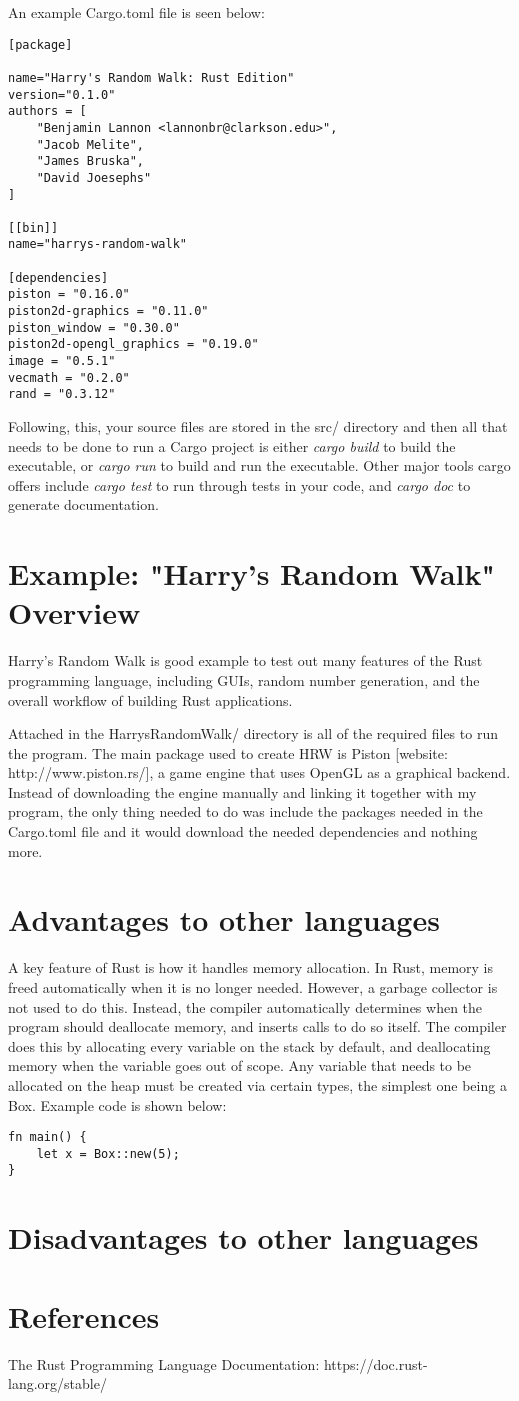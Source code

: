 \documentclass{article}
\begin{document}
An example Cargo.toml file is seen below:

\begin{lstlisting}
[package]

name="Harry's Random Walk: Rust Edition"
version="0.1.0"
authors = [
	"Benjamin Lannon <lannonbr@clarkson.edu>",
	"Jacob Melite",
	"James Bruska",
	"David Joesephs"
]

[[bin]]
name="harrys-random-walk"

[dependencies]
piston = "0.16.0"
piston2d-graphics = "0.11.0"
piston_window = "0.30.0"
piston2d-opengl_graphics = "0.19.0"
image = "0.5.1"
vecmath = "0.2.0"
rand = "0.3.12"
\end{lstlisting}

Following, this, your source files are stored in the src/ directory and then all that needs to be done to run a Cargo project is either \emph{cargo build} to build the executable, or \emph{cargo run} to build and run the executable. Other major tools cargo offers include \emph{cargo test} to run through tests in your code, and \emph{cargo doc} to generate documentation.

\section{Example: "Harry's Random Walk" Overview}
Harry's Random Walk is good example to test out many features of the Rust programming language, including GUIs, random number generation, and the overall workflow of building Rust applications.

Attached in the HarrysRandomWalk/ directory is all of the required files to run the program. The main package used to create HRW is Piston [website: http://www.piston.rs/], a game engine that uses OpenGL as a graphical backend. Instead of downloading the engine manually and linking it together with my program, the only thing needed to do was include the packages needed in the Cargo.toml file and it would download the needed dependencies and nothing more.

\section{Advantages to other languages}
A key feature of Rust is how it handles memory allocation. In Rust, memory is freed automatically when it is no longer needed. However, a garbage collector is not used to do this. Instead, the compiler automatically determines when the program should deallocate memory, and inserts calls to do so itself. The compiler does this by allocating every variable on the stack by default, and deallocating memory when the variable goes out of scope. Any variable that needs to be allocated on the heap must be created via certain types, the simplest one being a Box. Example code is shown below:
\begin{lstlisting}
fn main() {
	let x = Box::new(5);
}
\end{lstlisting}

\section{Disadvantages to other languages}

\section{References}
The Rust Programming Language Documentation: https://doc.rust-lang.org/stable/
\end{document}
